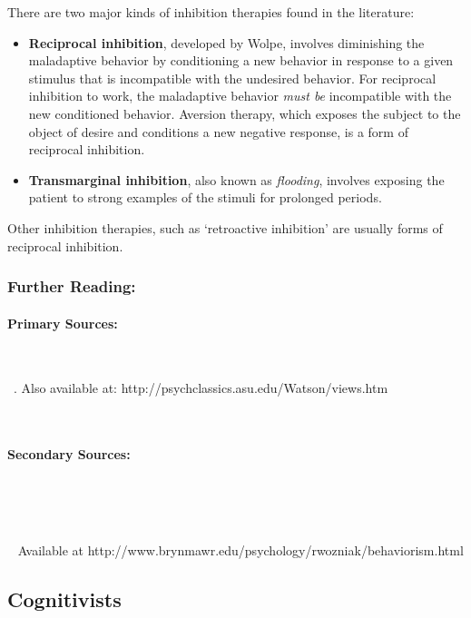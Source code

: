 \begin{refsection}
There are two major kinds of inhibition therapies found in the literature:

\begin{itemize}
\item \textbf{Reciprocal inhibition}, developed by Wolpe, involves diminishing the maladaptive behavior by conditioning a new behavior in response to a given stimulus that is incompatible with the undesired behavior. For reciprocal inhibition to work, the maladaptive behavior \emph{must be} incompatible with the new conditioned behavior. Aversion therapy, which exposes the subject to the object of desire and conditions a new negative response, is a form of reciprocal inhibition.

\item \textbf{Transmarginal inhibition}, also known as \emph{flooding}, involves exposing the patient to strong examples of the stimuli for prolonged periods.

\end{itemize}

Other inhibition therapies, such as `retroactive inhibition' are usually forms of reciprocal inhibition.

\subsubsection{Further Reading:}
\label{furtherreading:}

\paragraph{Primary Sources:}
\label{primarysources:}

~\citep{Skinner:2005wr}

~\citep{Watson:1913tq}. Also available at: http:\slash \slash psychclassics.asu.edu\slash Watson\slash views.htm

~\citep{Watson:iMwU-3B8}

\paragraph{Secondary Sources:}
\label{secondarysources:}

~\citep{Hornstein:2002wq}

~\citep{Wolpe:1958vt}

~\citep{Wozniak:1997vj} Available at http:\slash \slash www.brynmawr.edu\slash psychology\slash rwozniak\slash behaviorism.html

\subsection{Cognitivists}
\label{cognitivists}


\end{refsection}
